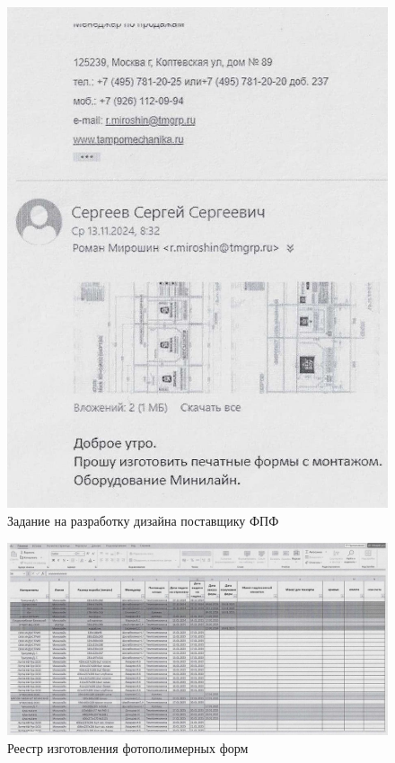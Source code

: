 \begin{figure}
\begin{center}
 \includegraphics[height=0.4\textheight, keepaspectratio]{Pics/II.8.7.jpg}
\end{center}
 \caption{Задание на разработку дизайна поставщику ФПФ}
 \label{pic:II.8.7}
\end{figure}

\begin{figure}
\begin{center}
 \includegraphics[height=0.3\textheight, keepaspectratio]{Pics/II.5.5.jpg}
\end{center}
 \caption{Реестр изготовления фотополимерных форм}
 \label{pic:II.5.5}
\end{figure}





